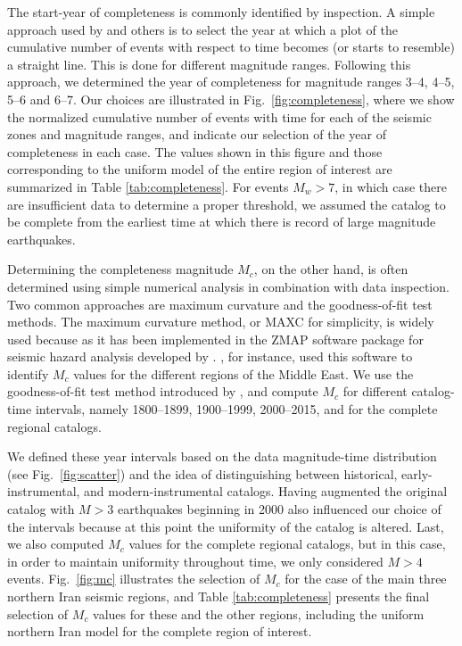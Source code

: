 The start-year of completeness is commonly identified by inspection. A simple approach used by \citet{Frankel1995} and others is to select the year at which a plot of the cumulative number of events with respect to time becomes (or starts to resemble) a straight line. This is done for different magnitude ranges. Following this approach, we determined the year of completeness for magnitude ranges 3--4, 4--5, 5--6 and 6--7. Our choices are illustrated in Fig.~\ref{fig:completeness}, where we show the normalized cumulative number of events with time for each of the seismic zones and magnitude ranges, and indicate our selection of the year of completeness in each case. The values shown in this figure and those corresponding to the uniform model of the entire region of interest are summarized in Table \ref{tab:completeness}. For events $M_w>7$, in which case there are insufficient data to determine a proper threshold, we assumed the catalog to be complete from the earliest time at which there is record of large magnitude earthquakes. 

Determining the completeness magnitude $M_c$, on the other hand, is often determined using simple numerical analysis in combination with data inspection. Two common approaches are maximum curvature and the goodness-of-fit test methods. The maximum curvature method, or MAXC for simplicity, is widely used because as it has been implemented in the ZMAP software package for seismic hazard analysis developed by \citet{Wiemer2001}. \citet{Zare2014}, for instance, used this software to identify $M_c$ values for the different regions of the Middle East. We use the goodness-of-fit test method introduced by \citet{Wiemer2000}, and compute $M_c$ for different catalog-time intervals, namely 1800--1899, 1900--1999, 2000--2015, and for the complete regional catalogs.

We defined these year intervals based on the data magnitude-time distribution (see Fig.~\ref{fig:scatter}) and the idea of distinguishing between historical, early-instrumental, and modern-instrumental catalogs. Having augmented the original catalog with $M>3$ earthquakes beginning in 2000 also influenced our choice of the intervals because at this point the uniformity of the catalog is altered. Last, we also computed $M_c$ values for the complete regional catalogs, but in this case, in order to maintain uniformity throughout time, we only considered $M>4$ events. Fig.~\ref{fig:mc} illustrates the selection of $M_c$ for the case of the main three northern Iran seismic regions, and Table \ref{tab:completeness} presents the final selection of $M_c$ values for these and the other regions, including the uniform northern Iran model for the complete region of interest.

